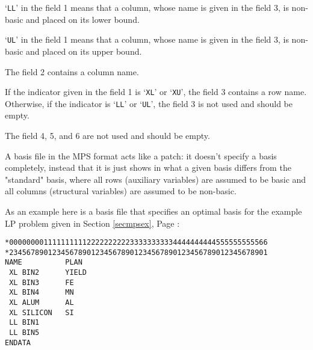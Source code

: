 `\verb|LL|' in the field 1 means that a column, whose name is given in
the field 3, is non-basic and placed on its lower bound.

`\verb|UL|' in the field 1 means that a column, whose name is given in
the field 3, is non-basic and placed on its upper bound.

The field 2 contains a column name.

If the indicator given in the field 1 is `\verb|XL|' or `\verb|XU|',
the field 3 contains a row name. Otherwise, if the indicator is
`\verb|LL|' or `\verb|UL|', the field 3 is not used and should be empty.

The field 4, 5, and 6 are not used and should be empty.

A basis file in the MPS format acts like a patch: it doesn't specify
a basis completely, instead that it is just shows in what a given basis
differs from the "standard" basis, where all rows (auxiliary variables)
are assumed to be basic and all columns (structural variables) are
assumed to be non-basic.

As an example here is a basis file that specifies an optimal basis
for the example LP problem given in Section \ref{secmpsex},
Page \pageref{secmpsex}:

\pagebreak

\begin{verbatim}
*000000001111111111222222222233333333334444444444555555555566
*234567890123456789012345678901234567890123456789012345678901
NAME          PLAN
 XL BIN2      YIELD
 XL BIN3      FE
 XL BIN4      MN
 XL ALUM      AL
 XL SILICON   SI
 LL BIN1
 LL BIN5
ENDATA
\end{verbatim}

